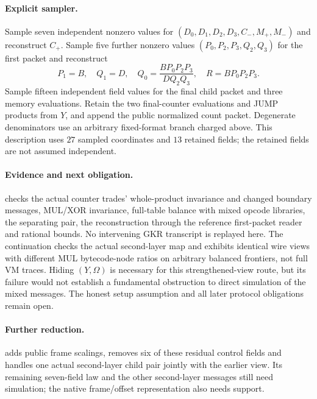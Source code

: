 \documentclass[11pt]{article}
\begin{document}
\paragraph{Explicit sampler.} Sample seven independent nonzero values for $(D_0,D_1,D_2,D_3,C_-,M_+,M_-)$ and reconstruct $C_+$. Sample five further nonzero values $(P_0,P_2,P_3,Q_2,Q_3)$ for the first packet and reconstruct
\[
 P_1=B,\quad Q_1=D,\quad
 Q_0=\frac{BP_0P_2P_3}{DQ_2Q_3},\quad R=BP_0P_2P_3.
\]
Sample fifteen independent field values for the final child packet and three memory evaluations. Retain the two final-counter evaluations and JUMP products from $Y$, and append the public normalized count packet. Degenerate denominators use an arbitrary fixed-format branch charged above. This description uses $27$ sampled coordinates and $13$ retained fields; the retained fields are not assumed independent.

\paragraph{Evidence and next obligation.}  checks the actual counter trades' whole-product invariance and changed boundary messages, MUL/XOR invariance, full-table balance with mixed opcode libraries, the separating pair, the reconstruction through the reference first-packet reader and rational bounds. No intervening GKR transcript is replayed here. The continuation  checks the actual second-layer map and exhibits identical wire views with different MUL bytecode-node ratios on arbitrary balanced frontiers, not full VM traces. Hiding $(Y,\Omega)$ is necessary for this strengthened-view route, but its failure would not establish a fundamental obstruction to direct simulation of the mixed messages. The honest setup assumption and all later protocol obligations remain open.

\paragraph{Further reduction.}  adds public frame scalings, removes six of these residual control fields and handles one actual second-layer child pair jointly with the earlier view. Its remaining seven-field law and the other second-layer messages still need simulation; the native frame/offset representation also needs support.
\end{document}
